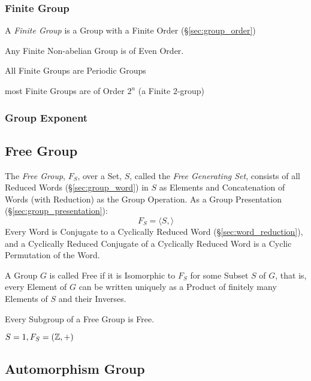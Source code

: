 \subsubsection{Finite Group}\label{sec:finite_group}

A \emph{Finite Group} is a Group with a Finite Order (\S\ref{sec:group_order})

Any Finite Non-abelian Group is of Even Order.

All Finite Groups are Periodic Groups

most Finite Groups are of Order $2^n$ (a Finite $2$-group)



\subsubsection{Group Exponent}\label{sec:group_exponent}



\subsection{Free Group}\label{sec:free_group}

The \emph{Free Group}, $F_S$, over a Set, $S$, called the \emph{Free Generating
  Set}, consists of all Reduced Words (\S\ref{sec:group_word}) in $S$ as
Elements and Concatenation of Words (with Reduction) as the Group Operation. As
a Group Presentation (\S\ref{sec:group_presentation}):
\[
    F_S = \langle S, \rangle
\]
Every Word is Conjugate to a Cyclically Reduced Word
(\S\ref{sec:word_reduction}), and a Cyclically Reduced Conjugate of a
Cyclically Reduced Word is a Cyclic Permutation of the Word.

A Group $G$ is called Free if it is Isomorphic to $F_S$ for some
Subset $S$ of $G$, that is, every Element of $G$ can be written
uniquely as a Product of finitely many Elements of $S$ and their
Inverses.

Every Subgroup of a Free Group is Free. \cite{hatcher02}

$S = {1}, F_S = (\mathbb{Z},+)$



\subsection{Automorphism Group}\label{sec:automorphism_group}

